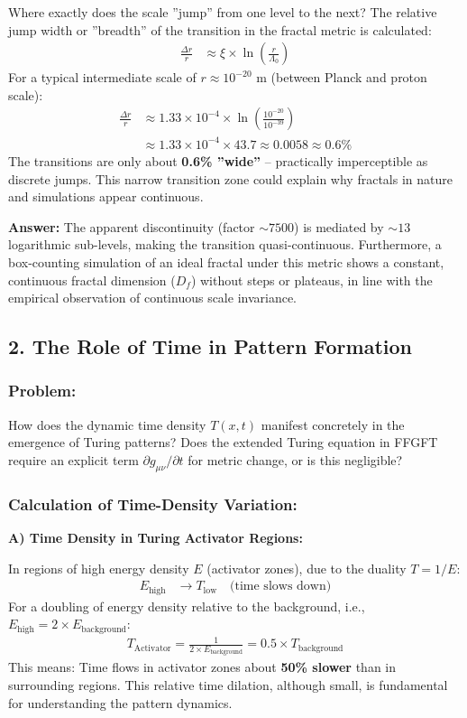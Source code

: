 	Where exactly does the scale ''jump'' from one level to the next? The relative jump width or ''breadth'' of the transition in the fractal metric is calculated:
	\begin{align*}
		\frac{\Delta r}{r} &\approx \xi \times \ln\left(\frac{r}{\Lambda_0}\right)
	\end{align*}
	For a typical intermediate scale of $r \approx 10^{-20}$ m (between Planck and proton scale):
	\begin{align*}
		\frac{\Delta r}{r} &\approx 1.33 \times 10^{-4} \times \ln\left(\frac{10^{-20}}{10^{-39}}\right) \\
		&\approx 1.33 \times 10^{-4} \times 43.7 \approx 0.0058 \approx 0.6\%
	\end{align*}
	The transitions are only about \textbf{0.6\% ''wide''} – practically imperceptible as discrete jumps. This narrow transition zone could explain why fractals in nature and simulations appear continuous.
	
	\textbf{Answer:} The apparent discontinuity (factor $\sim 7500$) is mediated by $\sim 13$ logarithmic sub-levels, making the transition quasi-continuous. Furthermore, a box-counting simulation of an ideal fractal under this metric shows a constant, continuous fractal dimension ($D_f$) without steps or plateaus, in line with the empirical observation of continuous scale invariance.
	
	\subsection*{2. The Role of Time in Pattern Formation}
	
	\subsubsection*{Problem:}
	How does the dynamic time density $T(x,t)$ manifest concretely in the emergence of Turing patterns? Does the extended Turing equation in FFGFT require an explicit term $\partial g_{\mu\nu}/\partial t$ for metric change, or is this negligible?
	
	\subsubsection*{Calculation of Time-Density Variation:}
	
	\textbf{A) Time Density in Turing Activator Regions:}
	
	In regions of high energy density $E$ (activator zones), due to the duality $T = 1/E$:
	\begin{align*}
		E_{\text{high}} &\rightarrow T_{\text{low}} \quad \text{(time slows down)}
	\end{align*}
	For a doubling of energy density relative to the background, i.e., $E_{\text{high}} = 2 \times E_{\text{background}}$:
	\begin{align*}
		T_{\text{Activator}} = \frac{1}{2 \times E_{\text{background}}} = 0.5 \times T_{\text{background}}
	\end{align*}
	This means: Time flows in activator zones about \textbf{50\% slower} than in surrounding regions. This relative time dilation, although small, is fundamental for understanding the pattern dynamics.
	
